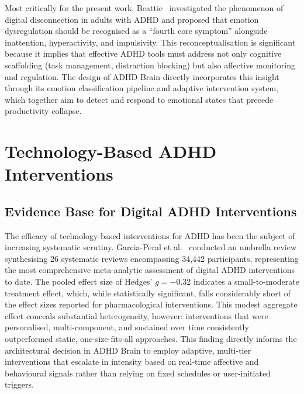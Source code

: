 Most critically for the present work, Beattie~\cite{beattie2025} investigated the phenomenon of digital disconnection in adults with ADHD and proposed that emotion dysregulation should be recognised as a ``fourth core symptom'' alongside inattention, hyperactivity, and impulsivity. This reconceptualisation is significant because it implies that effective ADHD tools must address not only cognitive scaffolding (task management, distraction blocking) but also affective monitoring and regulation. The design of ADHD Brain directly incorporates this insight through its emotion classification pipeline and adaptive intervention system, which together aim to detect and respond to emotional states that precede productivity collapse.

\section{Technology-Based ADHD Interventions}
\label{sec:litrev_tech_interventions}

\subsection{Evidence Base for Digital ADHD Interventions}
\label{sec:litrev_evidence_base}

The efficacy of technology-based interventions for ADHD has been the subject of increasing systematic scrutiny. Garcia-Peral et al.~\cite{garciaperal2025} conducted an umbrella review synthesising 26 systematic reviews encompassing 34,442 participants, representing the most comprehensive meta-analytic assessment of digital ADHD interventions to date. The pooled effect size of Hedges' $g = -0.32$ indicates a small-to-moderate treatment effect, which, while statistically significant, falls considerably short of the effect sizes reported for pharmacological interventions. This modest aggregate effect conceals substantial heterogeneity, however: interventions that were personalised, multi-component, and sustained over time consistently outperformed static, one-size-fits-all approaches. This finding directly informs the architectural decision in ADHD Brain to employ adaptive, multi-tier interventions that escalate in intensity based on real-time affective and behavioural signals rather than relying on fixed schedules or user-initiated triggers.

